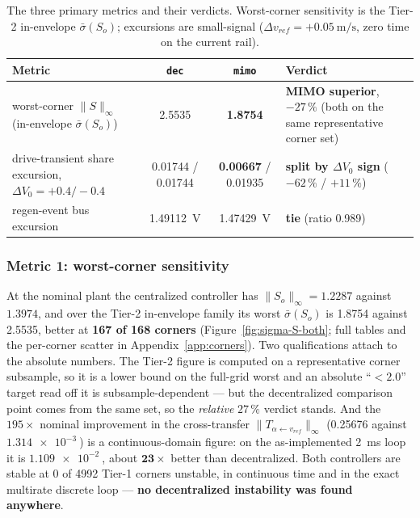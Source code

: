 \documentclass[energies,article,submit,pdftex,oneauthor]{Definitions/mdpi}
\begin{document}
\begin{table}[H]
\caption{The three primary metrics and their verdicts. Worst-corner sensitivity is the Tier-2
in-envelope $\bar\sigma(S_o)$; excursions are small-signal
($\Delta v_{ref} = +\SI{0.05}{\meter\per\second}$, zero time on the current rail).}
\label{tab:headline}
\begin{tabularx}{\textwidth}{XCCX}
\toprule
\textbf{Metric} & \texttt{dec} & \texttt{mimo} & \textbf{Verdict} \\
\midrule
worst-corner $\|S\|_\infty$ (in-envelope $\bar\sigma(S_o)$) & 2.5535 & \textbf{1.8754} & \textbf{MIMO superior}, $-27\,\%$ (both on the same representative corner set) \\
drive-transient share excursion, $\Delta V_0 = +0.4 / -0.4$ & 0.01744 / 0.01744 & \textbf{0.00667} / 0.01935 & \textbf{split by $\Delta V_0$ sign} ($-62\,\%$ / $+11\,\%$) \\
regen-event bus excursion & \SI{1.49112}{\volt} & \SI{1.47429}{\volt} & \textbf{tie} (ratio 0.989) \\
\bottomrule
\end{tabularx}
\end{table}

\subsubsection{Metric 1: worst-corner sensitivity}
At the nominal plant the centralized controller has $\|S_o\|_\infty = 1.2287$ against $1.3974$,
and over the Tier-2 in-envelope family its worst $\bar\sigma(S_o)$ is \num{1.8754} against
\num{2.5535}, better at \textbf{167 of 168 corners} (Figure~\ref{fig:sigma-S-both};
full tables and the per-corner scatter in Appendix~\ref{app:corners}). Two qualifications attach
to the absolute numbers. The Tier-2 figure is computed on a representative corner subsample, so
it is a lower bound on the full-grid worst and an absolute ``$<2.0$'' target read off it is
subsample-dependent --- but the decentralized comparison point comes from the same set, so the
\emph{relative} $27\,\%$ verdict stands. And the $195\times$ nominal improvement in the
cross-transfer $\|T_{\alpha\leftarrow v_{ref}}\|_\infty$ (\num{0.25676} against
$\SI{1.314e-3}{}$) is a continuous-domain figure: on the as-implemented
\SI{2}{\milli\second} loop it is $\SI{1.109e-2}{}$, about $\mathbf{23\times}$ better than
decentralized. Both controllers are stable at 0 of 4992 Tier-1 corners unstable, in continuous
time and in the exact multirate discrete loop --- \textbf{no decentralized instability was found
anywhere}.
\end{document}
